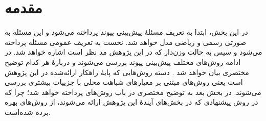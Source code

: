 \section{مقدمه}
در این بخش، ابتدا به تعریف مسئلهٔ پیش‌بینی پیوند پرداخته می‌شود و این مسئله به صورتی رسمی و ریاضی مدل خواهد شد. نخست به تعریف عمومی مسئله پرداخته می‌شود و سپس به حالت وزن‌دار که در این پژوهش مد نظر است اشاره خواهد شد. در ادامه روش‌های مختلف پیش‌بینی پیوند بررسی می‌شوند و دربارهٔ هر کدام توضیح مختصری بیان خواهد شد . دسته روش‌هایی که پایهٔ راهکار ارائه‌شده در این پژوهش است یعنی روش‌های مبتنی بر معیارهای شباهت محلی با جزییات بیشتری بررسی می‌شوند. در بخش بعد به توضیح مختصری در باب روش‌های \CommunityDetection پرداخته خواهد شد؛ چرا که در روش پیشنهادی که در بخش‌های آیندهٔ این پژوهش ارائه می‌شوند، از روش‌های \CommunityDetection بهره برده شده‌است.
\\[1cm]
